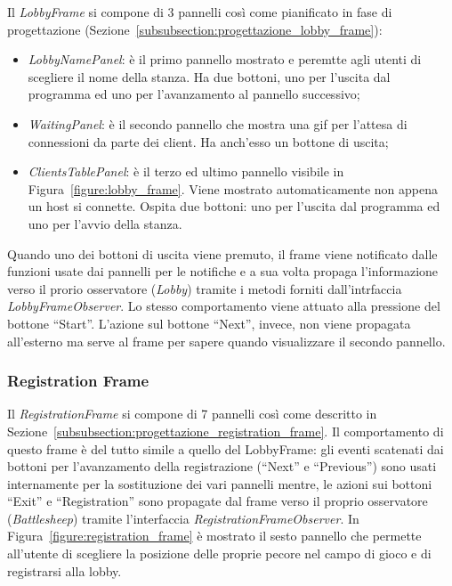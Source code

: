 Il \textit{LobbyFrame} si compone di 3 pannelli così come pianificato in fase di
progettazione (Sezione~\ref{subsubsection:progettazione_lobby_frame}):
\begin{itemize}
	\item \textit{LobbyNamePanel}: è il primo pannello mostrato e peremtte agli
	utenti di scegliere il nome della stanza. Ha due bottoni, uno per l'uscita
	dal programma ed uno per l'avanzamento al pannello successivo;
	\item \textit{WaitingPanel}: è il secondo pannello che mostra una gif per
	l'attesa di connessioni da parte dei client. Ha anch'esso un bottone di
	uscita;
	\item \textit{ClientsTablePanel}: è il terzo ed ultimo pannello visibile in
	Figura~\ref{figure:lobby_frame}. Viene mostrato automaticamente non appena
	un host si connette. Ospita due bottoni: uno per l'uscita dal programma ed
	uno per l'avvio della stanza.
\end{itemize}
Quando uno dei bottoni di uscita viene premuto, il frame viene notificato dalle
funzioni usate dai pannelli per le notifiche e a sua volta propaga
l'informazione verso il prorio osservatore (\textit{Lobby}) tramite i metodi
forniti dall'intrfaccia \textit{LobbyFrameObserver}. Lo stesso comportamento
viene attuato alla pressione del bottone ``Start''. L'azione sul bottone
``Next'', invece, non viene propagata all'esterno ma serve al frame per sapere
quando visualizzare il secondo pannello.



\subsubsection{Registration Frame}
Il \textit{RegistrationFrame} si compone di 7 pannelli così come descritto in
Sezione~\ref{subsubsection:progettazione_registration_frame}.\newline
Il comportamento di questo frame è del tutto simile a quello del LobbyFrame: gli
eventi scatenati dai bottoni per l'avanzamento della registrazione (``Next'' e
``Previous'') sono usati internamente per la sostituzione dei vari pannelli
mentre, le azioni sui bottoni ``Exit'' e ``Registration'' sono propagate dal
frame verso il proprio osservatore (\textit{Battlesheep}) tramite l'interfaccia
\textit{RegistrationFrameObserver}.\newline
In Figura~\ref{figure:registration_frame} è mostrato il sesto pannello che
permette all'utente di scegliere la posizione delle proprie pecore nel campo di
gioco e di registrarsi alla lobby.



